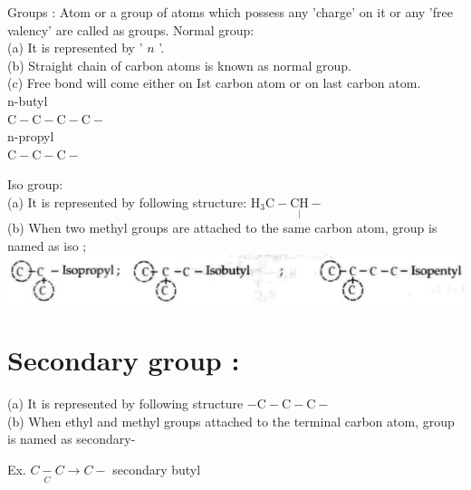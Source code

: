 \documentclass[10pt]{article}
\begin{document}
Groups : Atom or a group of atoms which possess any 'charge' on it or any 'free valency' are called as groups. Normal group:\\
(a) It is represented by ' $n$ '.\\
(b) Straight chain of carbon atoms is known as normal group.\\
(c) Free bond will come either on Ist carbon atom or on last carbon atom.\\
n-butyl\\
$\mathrm{C}-\mathrm{C}-\mathrm{C}-\mathrm{C}-$\\
n-propyl\\
$\mathrm{C}-\mathrm{C}-\mathrm{C}-$

Iso group:\\
(a) It is represented by following structure: $\mathrm{H}_{3} \mathrm{C}-\underset{\mid}{\mathrm{CH}}-$\\
(b) When two methyl groups are attached to the same carbon atom, group is named as iso ;\\
\includegraphics[max width=\textwidth, center]{2025_01_28_8470952b98110cec3aabg-009}

\section*{Secondary group :}
(a) It is represented by following structure $-\mathrm{C}-\mathrm{C}-\mathrm{C}-$\\
(b) When ethyl and methyl groups attached to the terminal carbon atom, group is named as secondary-

Ex. $\underset{C}{C-C} \rightarrow C-$ secondary butyl
\end{document}

